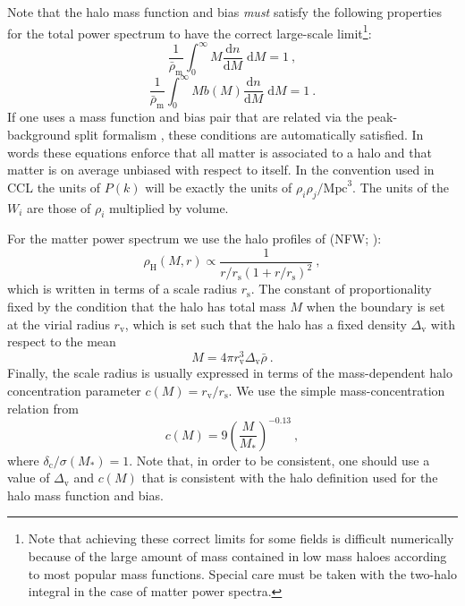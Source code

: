 \documentclass[\docopts]{\docclass}
\begin{document}
Note that the halo mass function and bias \emph{must} satisfy the following properties for the total power spectrum to have the correct large-scale limit\footnote{Note that achieving these correct limits for some fields is difficult numerically because of the large amount of mass contained in low mass haloes according to most popular mass functions. Special care must be taken with the two-halo integral in the case of matter power spectra.}:
\begin{equation}
\frac{1}{\bar\rho_\mathrm{m}}\int_0^\infty M\frac{\mathrm{d}n}{\mathrm{d}M}\;\mathrm{d}M=1\ ,
\label{eq:mf_normalisation}
\end{equation}
\begin{equation}
\frac{1}{\bar\rho_\mathrm{m}}\int_0^\infty Mb(M)\frac{\mathrm{d}n}{\mathrm{d}M}\;\mathrm{d}M=1\ .
\label{eq:bias_normalisation}
\end{equation}
If one uses a mass function and bias pair that are related via the peak-background split formalism \citep{Mo1996,Sheth2001}, these conditions are automatically satisfied. In words these equations enforce that all matter is associated to a halo and that matter is on average unbiased with respect to itself. In the convention used in CCL the units of $P(k)$ will be exactly the units of $\rho_i\rho_j / \mathrm{Mpc}^3$. The units of the $W_i$ are those of $\rho_i$ multiplied by volume.

For the matter power spectrum we use the halo profiles of \citeauthor*{Navarro1997} (NFW; \citeyear{Navarro1997}):
\begin{equation}
\rho_\mathrm{H}(M,r)\propto\frac{1}{r/r_\mathrm{s}(1+r/r_\mathrm{s})^2}\ ,
\label{eq:NFW_profile}
\end{equation}
which is written in terms of a scale radius $r_\mathrm{s}$. The constant of proportionality fixed by the condition that the halo has total mass $M$ when the boundary is set at the virial radius $r_\mathrm{v}$, which is set such that the halo has a fixed density $\Delta_\mathrm{v}$ with respect to the mean
\begin{equation}
M=4\pi r_\mathrm{v}^3\Delta_\mathrm{v}\bar\rho\ .
\label{eq:virial_radius}
\end{equation}
Finally, the scale radius is usually expressed in terms of the mass-dependent halo concentration parameter $c(M)=r_\mathrm{v}/r_\mathrm{s}$. We use the simple mass-concentration relation from \cite{Bullock2001}
\begin{equation}
c(M)=9\left(\frac{M}{M_*}\right)^{-0.13}\ ,
\end{equation}
where $\delta_\mathrm{c}/\sigma(M_*)=1$.
Note that, in order to be consistent, one should use a value of $\Delta_\mathrm{v}$ and $c(M)$ that is consistent with the halo definition used for the halo mass function and bias.
\end{document}
